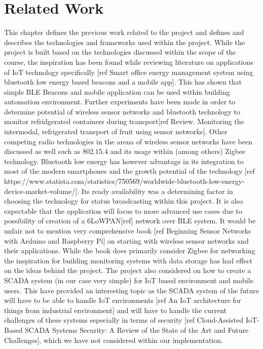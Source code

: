 \chapter{Related Work}
\label{cha:related-work}

This chapter defines the previous work related to the project and defines and describes the technologies and frameworks used within the project. While the project is built based on the technologies discussed within the scope of the course, the inspiration has been found while reviewing literature on applications of IoT technology specifically [ref Smart office energy management system using bluetooth low energy based beacons and a mobile app]. This has shown that simple BLE Beacons and mobile application can be used within building automation environment. Further experiments have been made in order to determine potential of wireless sensor networks and bluetooth technology to monitor refridgerated containers during transport[ref Review. Monitoring the intermodal, refrigerated transport of fruit using sensor networks]. Other competing radio technologies in the arena of wireless sensor networks have been discussed as well such as 802.15.4 and its usage within (among others) Zigbee technology. Bluetooth low energy has however advantage in its integration to most of the modern smartphones and the growth potential of the technology [ref https://www.statista.com/statistics/750569/worldwide-bluetooth-low-energy-device-market-volume/]. Its ready availability was a determining factor in choosing the technology for status broadcasting within this project. It is also expectable that the application will focus to more advanced use cases due to possibility of creation of a 6LoWPAN[ref] network over BLE system. It would be unfair not to mention very comprehensive book [ref Beginning Sensor Networks with Arduino and Raspberry Pi] on starting with wireless sensor networks and their applications. While the book does primarily consider Zigbee for networking the inspiration for building monitoring systems with data storage has had effect on the ideas behind the project. The project also considered on how to create a SCADA system (in our case very simple) for IoT based environment and mobile users. This have provided an interesting topic as the SCADA system of the future will have to be able to handle IoT environments [ref An IoT architecture for things from industrial environment] and will have to handle the current challenges of these systems especially in terms of security [ref Cloud-Assisted IoT-Based SCADA Systems Security: A Review of the State of the Art and Future Challenges], which we have not considered within our implementation.


